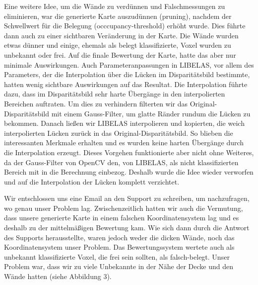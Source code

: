 \documentclass[12pt,titlepage, a4paper]{article}
\begin{document}
Eine weitere Idee, um die Wände zu verdünnen und Falschmessungen zu eliminieren, war die generierte Karte auszudünnen (pruning), nachdem der Schwellwert für die Belegung (occcupancy-threshold) erhöht wurde. Dies führte dann auch zu einer sichtbaren Veränderung in der Karte. Die Wände wurden etwas dünner und einige, ehemals als belegt klassifizierte, Voxel wurden zu unbekannt oder frei. Auf die finale Bewertung der Karte, hatte das aber nur minimale Auswirkungen. Auch Parameteranpassungen in LIBELAS, vor allem des Parameters, der die Interpolation über die Lücken im Disparitätsbild bestimmte, hatten wenig sichtbare Auswirkungen auf das Resultat. Die Interpolation führte dazu, dass im Disparitätsbild sehr harte Übergänge in den interpolierten Bereichen auftraten. Um dies zu verhindern filterten wir das Original-Disparitätsbild mit einem Gauss-Filter, um glatte Ränder rundum die Lücken zu bekommen. Danach ließen wir LIBELAS interpolieren und kopierten, die weich interpolierten Lücken zurück in das Original-Disparitätsbild. So blieben die interessanten Merkmale erhalten und es wurden keine harten Übergänge durch die Interpolation erzeugt. Dieses Vorgehen funktionierte aber nicht ohne Weiteres, da der Gauss-Filter von OpenCV den, von LIBELAS, als nicht klassifizierten Bereich mit in die Berechnung einbezog. Deshalb wurde die Idee wieder verworfen und auf die Interpolation der Lücken komplett verzichtet.

Wir entschlossen uns eine Email an den Support zu schreiben, um nachzufragen, wo genau unser Problem lag.
Zwischenzeitlich hatten wir auch die Vermutung, dass unsere generierte Karte in einem falschen Koordinatensystem lag und es deshalb zu der mittelmäßigen Bewertung kam.
Wie sich dann durch die Antwort des Supports herausstellte, waren jedoch weder die dicken Wände, noch das Koordinatensystem unser Problem. Das Bewertungssystem wertete auch als unbekannt klassifizierte Voxel, die frei sein sollten, als falsch-belegt. Unser Problem war, dass wir zu viele Unbekannte in der Nähe der Decke und den Wände hatten (siehe Abbildung 3).
\end{document}
